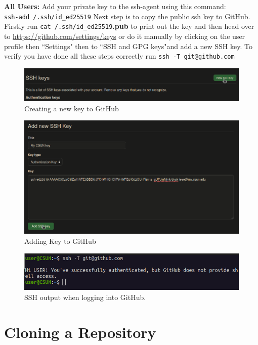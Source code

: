 \documentclass[12pt, a4paper]{article}
\begin{document}
\noindent \textbf{All Users:} Add your private key to the ssh-agent using this command:\\
\texttt{ssh-add \tilda/.ssh/id\_ed25519} Next step is to copy the public ssh key to GitHub. Firstly run \texttt{cat \tilda/.ssh/id\_ed25519}\textbf{.pub} to print out the key and then head over to \url{https://github.com/settings/keys} or do it manually by clicking on the user profile then ``Settings" then to ``SSH and GPG keys"and add a new SSH key. To verify you have done all these steps correctly run \texttt{ssh -T git@github.com} 
\begin{figure}[H]
\centering
\includegraphics[scale=0.4]{../images/workshop-I/GH-new-key.png}
\caption{Creating a new key to GitHub}
\end{figure}
\begin{figure}[H]
\centering
\includegraphics[scale=0.5]{../images/workshop-I/GH-add-key.png}
\caption{Adding Key to GitHub}
\end{figure}
\begin{figure}[H]
\centering
\includegraphics[scale=0.5]{../images/workshop-I/ssh-T.png}
\caption{SSH output when logging into GitHub.}
\end{figure}

\section{Cloning a Repository}
\end{document}
